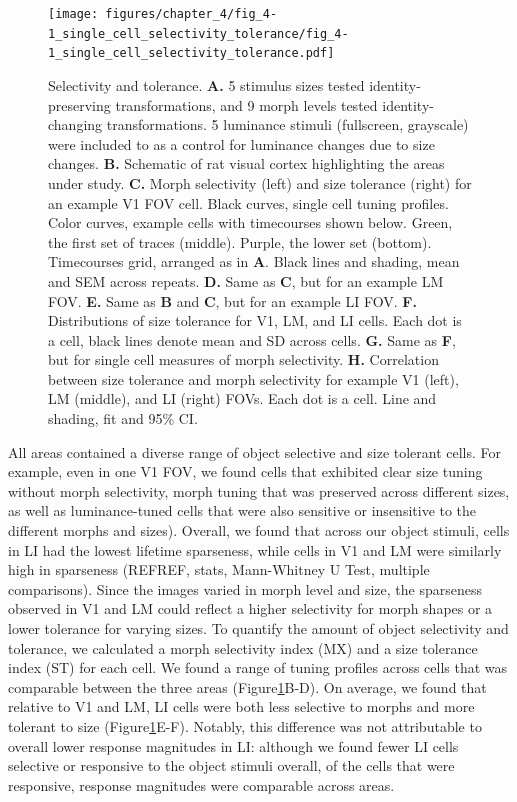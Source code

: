 \begin{figure}[t!]
    \texttt{[image: figures/chapter\_4/fig\_4-1\_single\_cell\_selectivity\_tolerance/fig\_4-1\_single\_cell\_selectivity\_tolerance.pdf]}
    \caption[Single neuron selectivity and tolerance]{Selectivity and tolerance. 
    \textbf{A.} 5 stimulus sizes tested identity-preserving transformations, and 9 morph levels tested identity-changing transformations. 5 luminance stimuli (fullscreen, grayscale) were included to as a control for luminance changes due to size changes. 
    \textbf{B.} Schematic of rat visual cortex highlighting the areas under study. 
    \textbf{C.} Morph selectivity (left) and size tolerance (right) for an example V1 FOV cell. Black curves, single cell tuning profiles. Color curves, example cells with timecourses shown below. Green, the first set of traces (middle). Purple, the lower set (bottom). Timecourses grid, arranged as in \textbf{A}. Black lines and shading, mean and SEM across repeats.
    \textbf{D.} Same as \textbf{C}, but for an example LM FOV.
    \textbf{E.} Same as \textbf{B} and \textbf{C}, but for an example LI FOV.
    \textbf{F.} Distributions of size tolerance for V1, LM, and LI cells. Each dot is a cell, black lines denote mean and SD across cells.
    \textbf{G.} Same as \textbf{F}, but for single cell measures of morph selectivity. 
    \textbf{H.} Correlation between size tolerance and morph selectivity for example V1 (left), LM (middle), and LI (right) FOVs. Each dot is a cell. Line and shading, fit and 95\% CI.
    \label{fig:selectivity_tolerance}}
\end{figure}

All areas contained a diverse range of object selective and size tolerant cells. For example, even in one V1 FOV, we found cells that exhibited clear size tuning without morph selectivity, morph tuning that was preserved across different sizes, as well as luminance-tuned cells that were also sensitive or insensitive to the different morphs and sizes). Overall, we found that across our object stimuli, cells in LI had the lowest lifetime sparseness, while cells in V1 and LM were similarly high in sparseness (REFREF, stats, Mann-Whitney U Test, multiple comparisons). Since the images varied in morph level and size, the sparseness observed in V1 and LM could reflect a higher selectivity for morph shapes or a lower tolerance for varying sizes. To quantify the amount of object selectivity and tolerance, we calculated a morph selectivity index (MX) and a size tolerance index (ST) for each cell\cite{Zoccolan2007}. We found a range of tuning profiles across cells that was comparable between the three areas (Figure\ref{fig:selectivity_tolerance}B-D). On average, we found that relative to V1 and LM, LI cells were both less selective to morphs and more tolerant to size (Figure\ref{fig:selectivity_tolerance}E-F). Notably, this difference was not attributable to overall lower response magnitudes in LI: although we found fewer LI cells selective or responsive to the object stimuli overall, of the cells that were responsive, response magnitudes were comparable across areas. 


